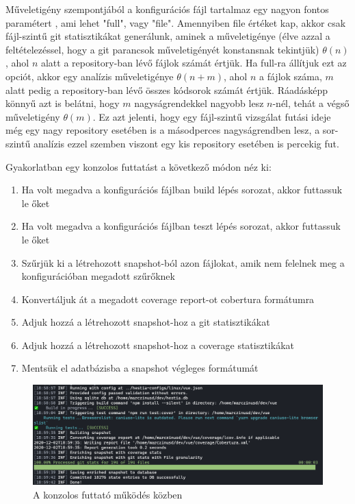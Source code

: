 Műveletigény szempontjából a konfigurációs fájl tartalmaz egy nagyon fontos paramétert , ami lehet "full", vagy "file". Amennyiben file értéket kap, akkor csak fájl-szintű git statisztikákat generálunk, aminek a műveletigénye (élve azzal a feltételezéssel, hogy a git parancsok műveletigényét konstansnak tekintjük) \( \theta(n) \), ahol \(n\) alatt a repository-ban lévő fájlok számát értjük. Ha full-ra állítjuk ezt az opciót, akkor egy analízis műveletigénye \( \theta(n + m) \), ahol \(n\) a fájlok száma, \(m\) alatt pedig a repository-ban lévő összes kódsorok számát értjük. Ráadásképp könnyű azt is belátni, hogy \(m\) nagyságrendekkel nagyobb lesz \(n\)-nél, tehát a végső műveletigény \( \theta(m) \). Ez azt jelenti, hogy egy fájl-szintű vizsgálat futási ideje még egy nagy repository esetében is a másodperces nagyságrendben lesz, a sor-szintű analízis ezzel szemben viszont egy kis repository esetében is percekig fut.

Gyakorlatban egy konzolos futtatást a következő módon néz ki:
\begin{enumerate}
    \item Ha volt megadva a konfigurációs fájlban build lépés sorozat, akkor futtassuk le őket
    \item Ha volt megadva a konfigurációs fájlban teszt lépés sorozat, akkor futtassuk le őket
    \item Szűrjük ki a létrehozott snapshot-ból azon fájlokat, amik nem felelnek meg a konfigurációban megadott szűrőknek
    \item Konvertáljuk át a megadott coverage report-ot cobertura formátumra
    \item Adjuk hozzá a létrehozott snapshot-hoz a git statisztikákat
    \item Adjuk hozzá a létrehozott snapshot-hoz a coverage statisztikákat
    \item Mentsük el adatbázisba a snapshot végleges formátumát
\end{enumerate}

\begin{figure}[H]
    \centering
    \includegraphics[width=1\textwidth]{images/hestia-console-run-vue.png}
    \caption{A konzolos futtató működés közben}
    \label{fig:console-runner-example}
\end{figure}

